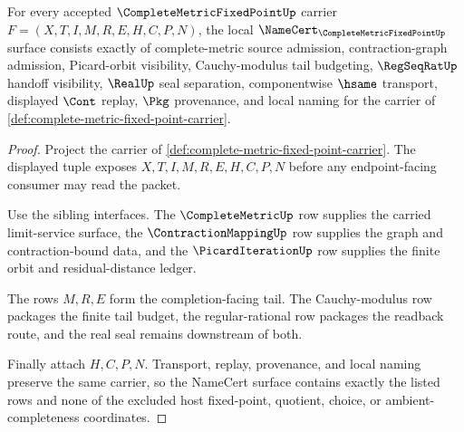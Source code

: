\begin{theorem}
\label{thm:complete-metric-fixed-point-namecert-obligations}
For every accepted $\CompleteMetricFixedPointUp$ carrier $F=(X,T,I,M,R,E,H,C,P,N)$, the local $\NameCert_{\CompleteMetricFixedPointUp}$ surface consists exactly of complete-metric source admission, contraction-graph admission, Picard-orbit visibility, Cauchy-modulus tail budgeting, $\RegSeqRatUp$ handoff visibility, $\RealUp$ seal separation, componentwise $\hsame$ transport, displayed $\Cont$ replay, $\Pkg$ provenance, and local naming for the carrier of \autoref{def:complete-metric-fixed-point-carrier}.
\end{theorem}
\begin{proof}
Project the carrier of \autoref{def:complete-metric-fixed-point-carrier}. The displayed tuple exposes $X,T,I,M,R,E,H,C,P,N$ before any endpoint-facing consumer may read the packet.

Use the sibling interfaces. The $\CompleteMetricUp$ row supplies the carried limit-service surface, the $\ContractionMappingUp$ row supplies the graph and contraction-bound data, and the $\PicardIterationUp$ row supplies the finite orbit and residual-distance ledger.

The rows $M,R,E$ form the completion-facing tail. The Cauchy-modulus row packages the finite tail budget, the regular-rational row packages the readback route, and the real seal remains downstream of both.

Finally attach $H,C,P,N$. Transport, replay, provenance, and local naming preserve the same carrier, so the NameCert surface contains exactly the listed rows and none of the excluded host fixed-point, quotient, choice, or ambient-completeness coordinates.
\end{proof}


